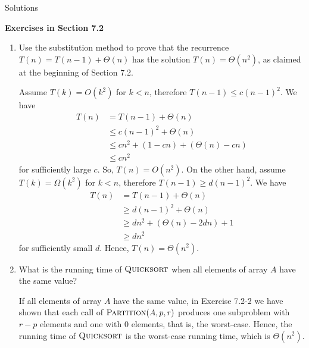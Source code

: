 \documentclass[12pt,reqno]{amsart}
\newif\ifanswer
\begin{document}
\hspace{10.5cm} {\footnotesize Solutions}

\vspace{0.5cm}
\hspace{5.5cm}\textbf{\large Exercises in Section 7.2}
\vspace{0.5cm}

\begin{enumerate}[1.]

\item Use the substitution method to prove that the recurrence $T(n) = T(n - 1) + \Theta(n)$ has the solution $T(n) = \Theta(n^2)$, as claimed at the beginning of Section 7.2.

\ifanswer
{}
Assume $T(k) = O(k^2)$ for $k < n$, therefore $T(n - 1) \leq c(n - 1)^2$. We have
\begin{align*}
    T(n) &= T(n - 1) + \Theta(n)\\
    &\leq c(n - 1)^2 + \Theta(n)\\
    &\leq cn^2 + (1 - cn) + (\Theta(n) - cn)\\
    &\leq cn^2
\end{align*}
for sufficiently large $c$. So, $T(n) = O(n^2)$. On the other hand, assume $T(k) = \Omega(k^2)$ for $k < n$, therefore $T(n - 1) \geq d(n - 1)^2$. We have
\begin{align*}
    T(n) &= T(n - 1) + \Theta(n)\\
    &\geq d(n - 1)^2 + \Theta(n)\\
    &\geq dn^2 + (\Theta(n) - 2dn) + 1\\
    &\geq dn^2
\end{align*}
for sufficiently small $d$. Hence, $T(n) = \Theta(n^2)$.
\vspace{1cm}



\item What is the running time of $\textsc{Quicksort}$ when all elements of array $A$ have the same value?

\ifanswer
{}
If all elements of array $A$ have the same value, in Exercise 7.2-2 we have shown that each call of $\textsc{Partition}(A, p, r)$ produces one subproblem with $r - p$ elements and one with $0$ elements, that is, the worst-case. Hence, the running time of $\textsc{Quicksort}$ is the worst-case running time, which is $\Theta(n^2)$.
\vspace{1cm}




\end{enumerate}
\end{document}
